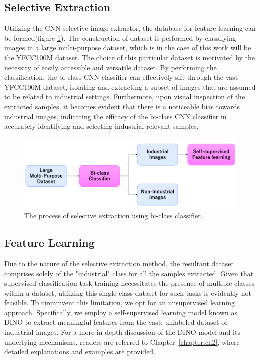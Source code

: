 \subsection{Selective Extraction}
\label{cnn selective extraction}
Utilizing the CNN selective image extractor, the database for feature learning can be formed(figure \ref{fig:cnn_extraction}). The construction of dataset is performed by classifying images in a large multi-purpose dataset, which is in the case of this work will be the YFCC100M dataset. The choice of this particular dataset is motivated by the necessity of easily accessible and versatile dataset. By performing the classification, the bi-class CNN classifier can effectively sift through the vast YFCC100M dataset, isolating and extracting a subset of images that are assumed to be related to industrial settings. Furthermore, upon visual inspection of the extracted samples, it becomes evident that there is a noticeable bias towards industrial images, indicating the efficacy of the bi-class CNN classifier in accurately identifying and selecting industrial-relevant samples.

\begin{figure}[h!]
	\begin{center}
		\includegraphics[width=1.0\linewidth]{Chapter_3/cnn_extraction.png}
	\end{center}
	\caption{The process of selective extraction using bi-class classifier.}
	\label{fig:cnn_extraction}
\end{figure} 	

\subsection{Feature Learning}
\label{feature learning cnn}
Due to the nature of the selective extraction method, the resultant dataset comprises solely of the "industrial" class for all the samples extracted. Given that supervised classification task training necessitates the presence of multiple classes within a dataset, utilizing this single-class dataset for such tasks is evidently not feasible. To circumvent this limitation, we opt for an unsupervised learning approach. Specifically, we employ a self-supervised learning model known as DINO to extract meaningful features from the vast, unlabeled dataset of industrial images. For a more in-depth discussion of the DINO model and its underlying mechanisms, readers are referred to Chapter~\ref{chapter:ch2}, where detailed explanations and examples are provided.

